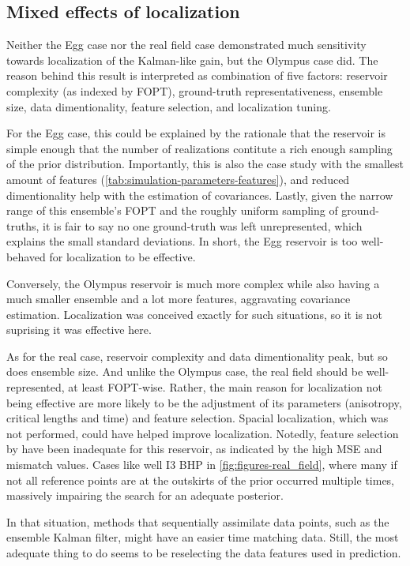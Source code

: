 \subsection{Mixed effects of localization}
Neither the Egg case nor the real field case demonstrated much sensitivity towards localization of the Kalman-like gain,
but the Olympus case did.
The reason behind this result is interpreted as combination of five factors:
reservoir complexity (as indexed by FOPT), 
ground-truth representativeness, 
ensemble size,
data dimentionality,
feature selection, and 
localization tuning.

For the Egg case, this could be explained by the rationale that 
the reservoir is simple enough that the number of realizations contitute a rich enough sampling of the prior distribution.
Importantly, this is also the case study with the smallest amount of features 
(\cref{tab:simulation-parameters-features}),
and reduced dimentionality help with the estimation of covariances.
%
Lastly, given the narrow range of this ensemble's FOPT and the roughly uniform sampling of ground-truths,
it is fair to say no one ground-truth was left unrepresented, which explains the small standard deviations.
%
In short, the Egg reservoir is too well-behaved for localization to be effective.

Conversely, the Olympus reservoir is much more complex while also having a much smaller ensemble
and a lot more features, aggravating covariance estimation.
Localization was conceived exactly for such situations, so it is not suprising it was effective here.

As for the real case, reservoir complexity and data dimentionality peak,
but so does ensemble size.
%
And unlike the Olympus case, the real field should be well-represented, at least FOPT-wise.
Rather, the main reason for localization not being effective 
are more likely to be the adjustment of its parameters 
(anisotropy, critical lengths and time)
and feature selection.
%
Spacial localization, which was not performed, could have helped improve localization.
%
Notedly, feature selection by have been inadequate for this reservoir,
as indicated by the high MSE and mismatch values.
Cases like well I3 BHP in \cref{fig:figures-real_field}, 
where many if not all reference points are at the outskirts of the prior 
occurred multiple times,
massively impairing the search for an adequate posterior.

In that situation, methods that sequentially assimilate data points, 
such as the ensemble Kalman filter, might have an easier time matching data.
%
Still, the most adequate thing to do seems to be reselecting the data features used in prediction. 

